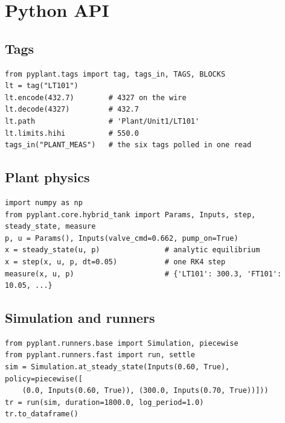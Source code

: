 \section{Python API}

\subsection{Tags}
\begin{lstlisting}
from pyplant.tags import tag, tags_in, TAGS, BLOCKS
lt = tag("LT101")
lt.encode(432.7)        # 4327 on the wire
lt.decode(4327)         # 432.7
lt.path                 # 'Plant/Unit1/LT101'
lt.limits.hihi          # 550.0
tags_in("PLANT_MEAS")   # the six tags polled in one read
\end{lstlisting}

\subsection{Plant physics}
\begin{lstlisting}
import numpy as np
from pyplant.core.hybrid_tank import Params, Inputs, step, steady_state, measure
p, u = Params(), Inputs(valve_cmd=0.662, pump_on=True)
x = steady_state(u, p)               # analytic equilibrium
x = step(x, u, p, dt=0.05)           # one RK4 step
measure(x, u, p)                     # {'LT101': 300.3, 'FT101': 10.05, ...}
\end{lstlisting}

\subsection{Simulation and runners}
\begin{lstlisting}
from pyplant.runners.base import Simulation, piecewise
from pyplant.runners.fast import run, settle
sim = Simulation.at_steady_state(Inputs(0.60, True), policy=piecewise([
    (0.0, Inputs(0.60, True)), (300.0, Inputs(0.70, True))]))
tr = run(sim, duration=1800.0, log_period=1.0)
tr.to_dataframe()
\end{lstlisting}

